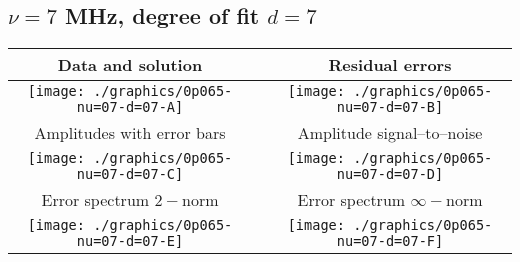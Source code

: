 

% 

\clearpage{}
\break{}

\subsection{$\nu = 7$ MHz, degree of fit $d = 7$}

\begin{table}[h]
    \begin{center}
        \begin{tabular}{ccc}
            Data and solution & \quad & Residual errors \\\hline
            \texttt{[image: ./graphics/0p065-nu=07-d=07-A]} &&
            \texttt{[image: ./graphics/0p065-nu=07-d=07-B]} \\[15pt]
            Amplitudes with error bars && Amplitude signal--to--noise \\\hline
            \texttt{[image: ./graphics/0p065-nu=07-d=07-C]} &&
            \texttt{[image: ./graphics/0p065-nu=07-d=07-D]} \\[15pt]
            Error spectrum $2-$norm && Error spectrum $\infty-$norm \\\hline
            \texttt{[image: ./graphics/0p065-nu=07-d=07-E]} &&
            \texttt{[image: ./graphics/0p065-nu=07-d=07-F]} \\[15pt]
        \end{tabular}
    \end{center}
\label{fig:elev=65, nu=7}
\end{table}



\endinput
